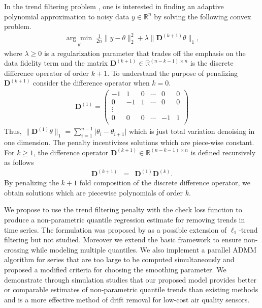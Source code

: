 \documentclass[12pt]{article}
\begin{document}
	In the trend filtering problem \citep{Kim2009, Tib2014}, one is interested in finding an adaptive polynomial approximation to noisy data $y \in \mathbb{R}^n$ by solving the following convex problem.
	\begin{eqnarray}
	\underset{\theta}{\arg\min}\; \frac{1}{2n} \lVert y - \theta \rVert_2^2 + \lambda \lVert \mathbf{D}^{(k+1)}\theta \rVert_1,
	\end{eqnarray}
	where $\lambda \geq 0$ is a regularization parameter that trades off the emphasis on the data fidelity term and the matrix $\mathbf{D}^{(k+1)} \in \mathbb{R}^{(n - k -1) \times n}$ is the discrete difference operator of order $k+1$. To understand the purpose of penalizing $\mathbf{D}^{(k+1)}$ consider the difference operator when $k = 0$.
	\begin{eqnarray}
	\mathbf{D}^{(1)} = \begin{pmatrix}
	-1 & 1 & 0 & \cdots & 0 & 0 \\
	0 & -1 & 1 & \cdots & 0 & 0 \\
	\vdots & & & & & \\
	0 & 0 & 0 & \cdots & -1 & 1 \\
	\end{pmatrix}
	\end{eqnarray}
	Thus, $\lVert \mathbf{D}^{(1)}\theta \rVert_1 = \sum_{i=1}^{n-1} \lvert \theta_i - \theta_{i+1} \rvert$ which is just total variation denoising in one dimension. The penalty incentivizes solutions which are piece-wise constant. For $k \geq 1$, the difference operator $\mathbf{D}^{(k+1)} \in \mathbb{R}^{(n-k-1) \times n}$ is defined recursively as follows
	\begin{eqnarray}
	\mathbf{D}^{(k+1)} & = & \mathbf{D}^{(1)}\mathbf{D}^{(k)}.
	\end{eqnarray}
	By penalizing the $k+1$ fold composition of the discrete difference operator, we obtain solutions which are piecewise polynomials of order $k$.
	
	We propose to use the trend filtering penalty with the check loss function to produce a non-parametric quantile regression estimate for removing trends in time series. The formulation was proposed by \cite{Kim2009} as a possible extension of $\ell_1$-trend filtering but not studied. Moreover we extend the basic framework to ensure non-crossing while modeling multiple quantiles. We also implement a parallel ADMM algorithm for series that are too large to be computed simultaneously and proposed a modified criteria for choosing the smoothing parameter. We demonstrate through simulation studies that our proposed model provides better or comparable estimates of non-parametric quantile trends than existing methods and is a more effective method of drift removal for low-cost air quality sensors. 
	
\end{document}
